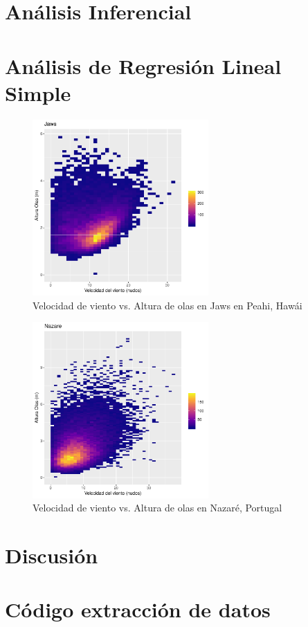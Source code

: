 \section{Análisis Inferencial}%
\label{sec:resultados}

\section{Análisis de Regresión Lineal Simple}
\label{sec:rls}

\begin{figure}[!ht]
\label{fig:wind_waves_jaws}
\centering
\includegraphics[width=0.6\textwidth]{./figures/jaws_bin2d.pdf}
  \caption{Velocidad de viento vs. Altura de olas en Jaws en Peahi, Hawái}
\end{figure}

\begin{figure}[!ht]
\label{fig:wind_waves_nazare}
\centering
\includegraphics[width=0.6\textwidth]{./figures/nazare_bin2d.pdf}
  \caption{Velocidad de viento vs. Altura de olas en Nazaré, Portugal}
\end{figure}

\section{Discusión}%
\label{sec:discusión}

\pagebreak
\appendix

\section{Código extracción de datos}%
\label{sec:codigo_extraccion_de_datos}






